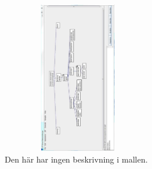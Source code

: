 \begin{enumerate}
    \begin{figure}[htbp]
        \centerline{\includegraphics[max height=250px, max width=250px]{Z. images/scrum.jpg}}
        \caption{Den här har ingen beskrivning i mallen.}
        \label{fig}
    \end{figure}
\end{enumerate}